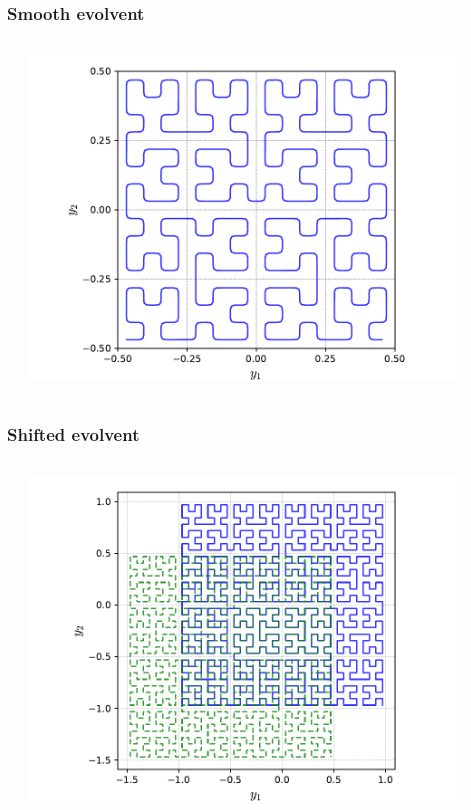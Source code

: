 \documentclass[aspectratio=1610]{beamer}
\begin{document}
\begin{frame}
  \frametitle{Smooth evolvent}
  \begin{columns}
    \begin{column}{0.5\textwidth}

    \end{column}
    \begin{column}{0.5\textwidth}
      \centerline{\includegraphics[width=0.9\textwidth]{smooth.pdf}}
    \end{column}
  \end{columns}
\end{frame}

\begin{frame}
  \frametitle{Shifted evolvent}
  \begin{columns}
    \begin{column}{0.5\textwidth}

    \end{column}
    \begin{column}{0.5\textwidth}
      \centerline{\includegraphics[width=0.9\textwidth]{shifted.pdf}}
    \end{column}
  \end{columns}
\end{frame}
\end{document}
